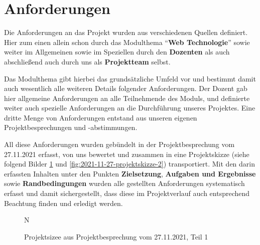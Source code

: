 
\section{Anforderungen} %



Die Anforderungen an das Projekt wurden aus verschiedenen Quellen definiert. Hier zum einen allein schon durch das Modulthema \enquote{\textbf{Web Technologie}} sowie weiter im Allgemeinen sowie im Speziellen durch den \textbf{Dozenten} als auch abschließend auch durch uns als \textbf{Projektteam} selbst. 

Das Modulthema gibt hierbei das grundsätzliche Umfeld vor und bestimmt damit auch wesentlich alle weiteren Details folgender Anforderungen. Der Dozent gab hier allgemeine Anforderungen an alle Teilnehmende des Moduls, und definierte weiter auch spezielle Anforderungen an die Durchführung unseres Projektes. Eine dritte Menge von Anforderungen entstand aus unseren eigenen Projektbesprechungen und -abstimmungen.  

All diese Anforderungen wurden gebündelt in der Projektbesprechung vom 27.11.2021 erfasst, von uns bewertet und zusammen in eine Projektskizze (siehe folgend Bilder \ref{fig:2021-11-27-projektskizze-1} und \ref{fig:2021-11-27-projektskizze-2}) transportiert. Mit den darin erfassten Inhalten unter den Punkten \textbf{Zielsetzung}, \textbf{Aufgaben und Ergebnisse} sowie \textbf{Randbedingungen} wurden alle gestellten Anforderungen systematisch erfasst und damit sichergestellt, dass diese im Projektverlauf auch entsprechend Beachtung finden und erledigt werden. 


\begin{figure}[H]N
    \centering
    \caption{Projektsizee aus Projektbesprechung vom 27.11.2021, Teil 1}
    \label{fig:2021-11-27-projektskizze-1}
\end{figure}


